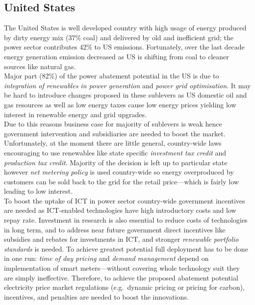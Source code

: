 \documentclass[11pt, twocolumn]{article}
\begin{document}
\subsection{United States}
The United States is well developed country with high usage of energy produced by dirty energy mix (37\% coal) and delivered by old and inefficient grid; the power sector contributes 42\% to US emissions. Fortunately, over the last decade energy generation emission decreased as US is shifting from coal to cleaner sources like natural gas.\\
Major part (82\%) of the power abatement potential in the US is due to \emph{integration of renewables in power generation} and \emph{power grid optimisation}. It may be hard to introduce changes proposed in these sublevers as US domestic oil and gas resources as well as low energy taxes cause low energy prices yielding low interest in renewable energy and grid upgrades.\\
Due to this reasons business case for majority of sublevers is weak hence government intervention and subsidiaries are needed to boost the market. Unfortunately, at the moment there are little general, country-wide laws encouraging to use renewables like state specific \emph{investment tax credit} and \emph{production tax credit}. Majority of the decision is left up to particular state however \emph{net metering policy} is used country-wide so energy overproduced by customers can be sold back to the grid for the retail price---which is fairly low leading to low interest.\\
To boost the uptake of ICT in power sector country-wide government incentives are needed as ICT-enabled technologies have high introductory costs and low repay rate. Investment in research is also essential to reduce costs of technologies in long term, and to address near future government direct incentives like subsidies and rebates for investments in ICT, and stronger \emph{renewable portfolio standards} is needed. To achieve greatest potential full deployment has to be done in one run: \emph{time of day pricing} and \emph{demand management} depend on implementation of smart meters---without covering whole technology suit they are simply ineffective. Therefore, to achieve the proposed abatement potential electricity price market regulations (e.g.\ dynamic pricing or pricing for carbon), incentives, and penalties are needed to boost the innovations.\\
\end{document}
